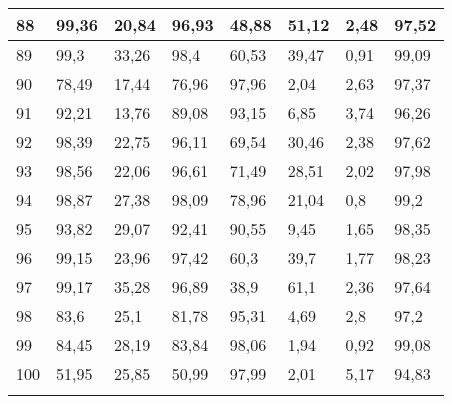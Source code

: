 \begin{longtable}[c]{|l|l|l|l|l|l|l|l|}
88              & 99,36        & 20,84        & 96,93       & 48,88         & 51,12         & 2,48          & 97,52         \\ \hline
89              & 99,3         & 33,26        & 98,4        & 60,53         & 39,47         & 0,91          & 99,09         \\ \hline
90              & 78,49        & 17,44        & 76,96       & 97,96         & 2,04          & 2,63          & 97,37         \\ \hline
91              & 92,21        & 13,76        & 89,08       & 93,15         & 6,85          & 3,74          & 96,26         \\ \hline
92              & 98,39        & 22,75        & 96,11       & 69,54         & 30,46         & 2,38          & 97,62         \\ \hline
93              & 98,56        & 22,06        & 96,61       & 71,49         & 28,51         & 2,02          & 97,98         \\ \hline
94              & 98,87        & 27,38        & 98,09       & 78,96         & 21,04         & 0,8           & 99,2          \\ \hline
95              & 93,82        & 29,07        & 92,41       & 90,55         & 9,45          & 1,65          & 98,35         \\ \hline
96              & 99,15        & 23,96        & 97,42       & 60,3          & 39,7          & 1,77          & 98,23         \\ \hline
97              & 99,17        & 35,28        & 96,89       & 38,9          & 61,1          & 2,36          & 97,64         \\ \hline
98              & 83,6         & 25,1         & 81,78       & 95,31         & 4,69          & 2,8           & 97,2          \\ \hline
99              & 84,45        & 28,19        & 83,84       & 98,06         & 1,94          & 0,92          & 99,08         \\ \hline
100             & 51,95        & 25,85        & 50,99       & 97,99         & 2,01          & 5,17          & 94,83         \\ \hline
\label{anx:max}
\end{longtable}
